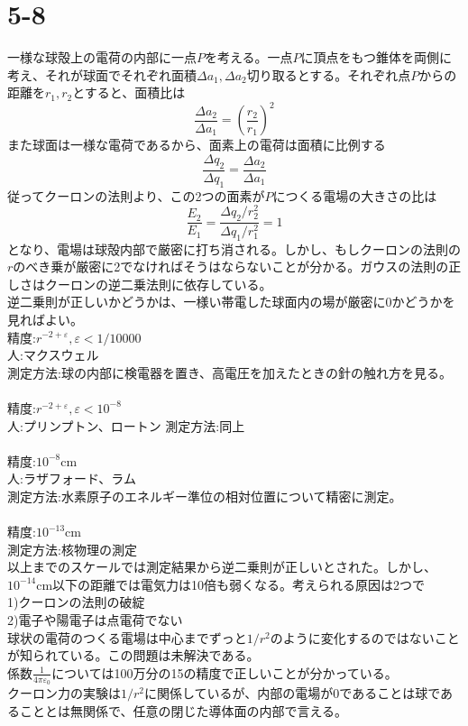 \documentclass{jsarticle}
\begin{document}
\section*{5-8}
\noindent
一様な球殻上の電荷の内部に一点\(P\)を考える。一点\(P\)に頂点をもつ錐体を両側に考え、それが球面でそれぞれ面積\(\Delta a_{1},\Delta a_{2}\)切り取るとする。それぞれ点\(P\)からの距離を\(r_{1},r_{2}\)とすると、面積比は
\[\frac{\Delta a_{2}}{\Delta a_{1}}=\left(\frac{r_{2}}{r_{1}}\right)^{2}\]
また球面は一様な電荷であるから、面素上の電荷は面積に比例する
\[\frac{\Delta q_{2}}{\Delta q_{1}}=\frac{\Delta a_{2}}{\Delta a_{1}}\]
従ってクーロンの法則より、この2つの面素が\(P\)につくる電場の大きさの比は
\[\frac{E_{2}}{E_{1}}=\frac{\Delta q_{2}/r_{2}^{2}}{\Delta q_{1}/r_{1}^{2}}=1\]
となり、電場は球殻内部で厳密に打ち消される。しかし、もしクーロンの法則の\(r\)のべき乗が厳密に2でなければそうはならないことが分かる。ガウスの法則の正しさはクーロンの逆二乗法則に依存している。\\
逆二乗則が正しいかどうかは、一様い帯電した球面内の場が厳密に0かどうかを見ればよい。\\
精度:\(r^{-2+\varepsilon},\varepsilon<1/10000\)\\
人:マクスウェル\\
測定方法:球の内部に検電器を置き、高電圧を加えたときの針の触れ方を見る。\\
\\
精度:\(r^{-2+\varepsilon},\varepsilon<10^{-8}\)\\
人:プリンプトン、ロートン
測定方法:同上\\
\\
精度:\(10^{-8}\)cm\\
人:ラザフォード、ラム\\
測定方法:水素原子のエネルギー準位の相対位置について精密に測定。\\
\\
精度:\(10^{-13}\)cm\\
測定方法:核物理の測定\\

以上までのスケールでは測定結果から逆二乗則が正しいとされた。しかし、\(10^{-14}\)cm以下の距離では電気力は10倍も弱くなる。考えられる原因は2つで\\
1)\hspace{2mm}クーロンの法則の破綻\\
2)\hspace{2mm}電子や陽電子は点電荷でない\\
球状の電荷のつくる電場は中心までずっと\(1/r^{2}\)のように変化するのではないことが知られている。この問題は未解決である。\\
係数\(\frac{1}{4\pi\varepsilon_{0}}\)については100万分の15の精度で正しいことが分かっている。\\
クーロン力の実験は\(1/r^{2}\)に関係しているが、内部の電場が0であることは球であることとは無関係で、任意の閉じた導体面の内部で言える。\\
\newpage
\end{document}
